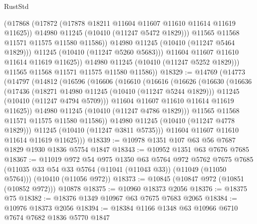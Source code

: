 \begin{lexlean}{RustStd}
\begin{coremodule}
                      (@17868
                        (@17872 (@17878 @18211 @11604 @11607 @11610 @11614 @11619 @11625))
                        @14980
                        @11245
                        (@10410 (@11247 @5472 @1829)))
                      @11565
                      @11568
                      @11571
                      @11575
                      @11580
                      @11586))
                  @14980
                  @11245
                  (@10410 (@11247 @5464 @1829)))
                @11245
                (@10410 (@11247 @5260 @5683)))
              @11604
              @11607
              @11610
              @11614
              @11619
              @11625))
          @14980
          @11245
          (@10410 (@11247 @5252 @1829)))
        @11565
        @11568
        @11571
        @11575
        @11580
        @11586))
@18329 := @14769
    (@14773
      (@14797
        (@14812
          (@16596
            (@16606
              (@16610
                (@16616
                  (@16626
                    (@16630
                      (@16636
                        (@17436
                          (@18271 @14980 @11245 (@10410 (@11247 @5244 @1829)))
                          @11245
                          (@10410 (@11247 @4794 @5709)))
                        @11604
                        @11607
                        @11610
                        @11614
                        @11619
                        @11625))
                    @14980
                    @11245
                    (@10410 (@11247 @4786 @1829)))
                  @11565
                  @11568
                  @11571
                  @11575
                  @11580
                  @11586))
              @14980
              @11245
              (@10410 (@11247 @4778 @1829)))
            @11245
            (@10410 (@11247 @3811 @5735)))
          @11604
          @11607
          @11610
          @11614
          @11619
          @11625)))
@18339 := @10978 @1351 @107 @63 @56 @7687 @1829 @1930 @1836 @5754 @1847
@18343 := @10952 @1351 @63 @7676 @7685
@18367 := @11019
    @972
    @54
    @975
    @1350
    @63
    @5764
    @972
    @5762
    @7675
    @7685
    (@11035 @33 @54 @33 @5764 (@11041 (@11043 @33)) (@11049 (@11050 @5764)))
    (@10410 (@11056 @972))
@18373 := @10845 (@10847 @972 (@10851 (@10852 @972))) @10878
@18375 := @10960 @18373 @2056
@18376 := @18375 @75
@18382 := @18376 @1349 @10967 @63 @7675 @7683 @2065
@18384 := @10976 @18373 @2056
@18394 := @18384 @1166 @1348 @63 @10966 @6710 @7674 @7682 @1836 @5770 @1847

\end{coremodule}
\end{lexlean}
